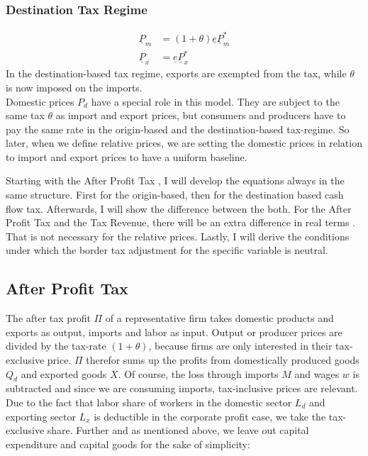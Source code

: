 \subsubsection*{Destination Tax Regime}
\begin{equation}\label{D.Tax}
\begin{aligned}
\underline P_m &=  \left( 1+\theta \right) \underline e\underline P^*_m \\
\underline P_x &= \underline e \underline P^*_x 
\end{aligned}
\end{equation}
In the destination-based tax regime, exports are exempted from the tax, while $\theta$ is now imposed on the imports.\\
Domestic prices $P_d$ have a special role in this model. They are subject to the same tax $\theta$ as import and export prices, but consumers and producers have to pay the same rate in the origin-based and the destination-based tax-regime. So later, when we define relative prices, we are setting the domestic prices in relation to import and export prices to have a uniform baseline. 


Starting with the After Profit Tax , I will develop the equations always in the same structure. First for the origin-based, then for the destination based cash flow tax. Afterwards, I will show the difference between the both. For the After Profit Tax and the Tax Revenue, there will be an extra difference in real terms . That is not necessary for the relative prices. Lastly, I will derive the conditions under which the border tax adjustment for the specific variable is neutral. 


\subsection*{After Profit Tax}
The after tax profit $\Pi$ of a representative firm takes domestic products  and exports as output, imports and labor as input. Output or producer prices are divided by the tax-rate $(1+\theta)$, because firms are only interested in their tax-exclusive price. $\Pi$ therefor sums up the profits from domestically produced goods $Q_d$ and exported goods $X$. Of course, the loss through imports $M$ and wages $w$ is subtracted and since we are consuming imports, tax-inclusive prices are relevant. Due to the fact that labor share of workers in the domestic sector $L_d$ and exporting sector $L_x$ is deductible in the corporate profit case, we take the tax-exclusive share. Further and as mentioned above, we leave out capital expenditure and capital goods for the sake of simplicity:


